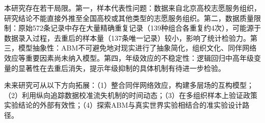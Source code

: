 \documentclass[12pt,a4paper]{article}
\begin{document}
本研究存在若干局限。第一，样本代表性问题：数据来自北京高校志愿服务组织，研究结论不能直接外推至全国高校或其他类型的志愿服务组织。第二，数据质量限制：原始572条记录中存在大量精确重复记录（139种组合各重复约4次），可能源于数据录入过程，去重后的样本量（137条唯一记录）较小，影响了统计检验力。第三，模型抽象性：ABM不可避免地对现实进行了抽象简化，组织文化、同伴网络效应等重要因素尚未纳入模型。第四，年级效应的不稳定性：逻辑回归中高年级变量的显著性在去重后消失，提示年级抑制的具体机制有待进一步检验。

未来研究可从以下方向拓展：（1）整合同伴网络效应，构建多层场的互构模型；（2）利用纵向追踪数据校准流失机制的时间动态；（3）在多组织样本上验证政策实验结论的外部有效性；（4）探索ABM与真实世界实验相结合的准实验设计路径。

\vspace{2em}

\end{document}
